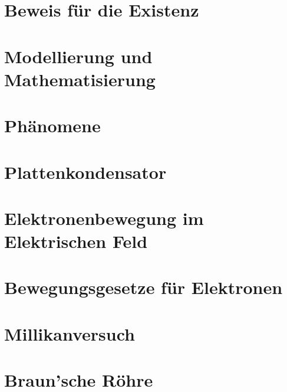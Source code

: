 \section{Beweis für die Existenz}




\section{Modellierung und Mathematisierung}




\section{Phänomene}




\section{Plattenkondensator} \label{sec:plattenkondensator}




\section{Elektronenbewegung im Elektrischen Feld} \label{sec:ElektronenwegungImEFeld}




\section{Bewegungsgesetze für Elektronen} \label{sec:BewegungsgesetzElektronen}




\section{Millikanversuch} \label{sec:Millikan}




\section{Braun'sche Röhre}  \label{sec:BraunscheRoehre}

